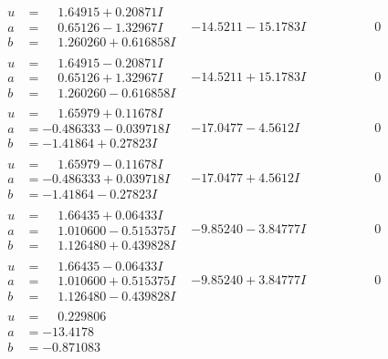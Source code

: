\documentclass[1p]{elsarticle_modified}
\theoremstyle{definition}
\begin{document}
$$\begin{array}{c|c|c}
\begin{aligned}
u &= \phantom{-}1.64915 + 0.20871 I \\
a &= \phantom{-}0.65126 - 1.32967 I \\
b &= \phantom{-}1.260260 + 0.616858 I\end{aligned}
 & -14.5211 - 15.1783 I & \phantom{-0.000000 } 0 \\ \hline\begin{aligned}
u &= \phantom{-}1.64915 - 0.20871 I \\
a &= \phantom{-}0.65126 + 1.32967 I \\
b &= \phantom{-}1.260260 - 0.616858 I\end{aligned}
 & -14.5211 + 15.1783 I & \phantom{-0.000000 } 0 \\ \hline\begin{aligned}
u &= \phantom{-}1.65979 + 0.11678 I \\
a &= -0.486333 - 0.039718 I \\
b &= -1.41864 + 0.27823 I\end{aligned}
 & -17.0477 - 4.5612 I & \phantom{-0.000000 } 0 \\ \hline\begin{aligned}
u &= \phantom{-}1.65979 - 0.11678 I \\
a &= -0.486333 + 0.039718 I \\
b &= -1.41864 - 0.27823 I\end{aligned}
 & -17.0477 + 4.5612 I & \phantom{-0.000000 } 0 \\ \hline\begin{aligned}
u &= \phantom{-}1.66435 + 0.06433 I \\
a &= \phantom{-}1.010600 - 0.515375 I \\
b &= \phantom{-}1.126480 + 0.439828 I\end{aligned}
 & -9.85240 - 3.84777 I & \phantom{-0.000000 } 0 \\ \hline\begin{aligned}
u &= \phantom{-}1.66435 - 0.06433 I \\
a &= \phantom{-}1.010600 + 0.515375 I \\
b &= \phantom{-}1.126480 - 0.439828 I\end{aligned}
 & -9.85240 + 3.84777 I & \phantom{-0.000000 } 0 \\ \hline\begin{aligned}
u &= \phantom{-}0.229806\phantom{ +0.000000I} \\
a &= -13.4178\phantom{ +0.000000I} \\
b &= -0.871083\phantom{ +0.000000I}\end{aligned}

\end{array}$$
\end{document}
